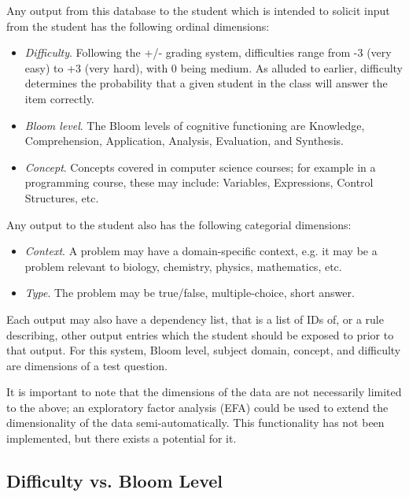 Any output from this database to the student which is intended to solicit input
from the student has the following ordinal dimensions:

\begin{itemize}

  \item \emph{Difficulty}. Following the +/- grading system, difficulties range
  from -3 (very easy) to +3 (very hard), with 0 being medium. As alluded to
  earlier, difficulty determines the probability that a given student in the 
  class will answer the item correctly.

  \item \emph{Bloom level}.  The Bloom levels of cognitive functioning are
  Knowledge, Comprehension, Application, Analysis, Evaluation, and Synthesis.

  \item \emph{Concept}.  Concepts covered in computer science courses; for
  example in a programming course, these may include: Variables, Expressions,
  Control Structures, etc.

\end{itemize}

Any output to the student also has the following categorial dimensions:

\begin{itemize}

  \item \emph{Context}.  A problem may have a domain-specific context, e.g. it
  may be a problem relevant to biology, chemistry, physics, mathematics, etc.

  \item \emph{Type}.  The problem may be true/false, multiple-choice, short
  answer.

\end{itemize}

Each output may also have a dependency list, that is a list of IDs of, or a
rule describing, other output entries which the student should be exposed to
prior to that output.  For this system, Bloom level, subject domain, concept,
and difficulty are dimensions of a test question.  

It is important to note that the dimensions of the data are not necessarily
limited to the above; an exploratory factor analysis (EFA) could be used to
extend the dimensionality of the data semi-automatically.  This functionality
has not been implemented, but there exists a potential for it.


\subsection{Difficulty vs. Bloom Level}

